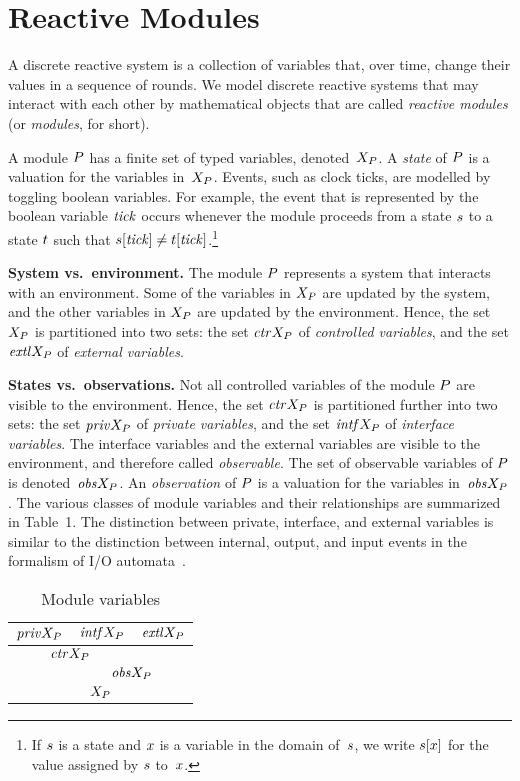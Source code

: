 \section{Reactive Modules}

A discrete reactive system is a collection of variables that, over time,
change their values in a sequence of rounds.
We model discrete reactive systems that may interact with each other by
mathematical objects that are called {\em reactive modules\/}
(or {\em modules}, for short).

 A module ${P}$ has a finite
set of typed variables, denoted~$X_{{P}}$. A {\em state\/} of
${P}$ is a valuation for the variables in~$X_{{P}}$. Events,
such as clock ticks, are modelled by toggling boolean variables.
For example, the event that is represented by the boolean variable
${\it tick\/}$ occurs whenever the module proceeds from a state $s$
to a state $t$ such that
$s[{\it tick\/}]\not=t[{\it tick\/}]$.\footnote{
  If $s$ is a state and $x$ is a variable in the domain of~$s$,
  we write $s[x]$ for the value assigned by $s$ to~$x$.}

\mypar
{\bf System vs.\ environment.}
The module ${P}$ represents a system that interacts with an environment.
Some of the variables in $X_{{P}}$ are updated by the system, and the
other variables in $X_{{P}}$ are updated by the environment.
Hence, the set $X_{{P}}$ is partitioned into two sets:
the set ${\it ctr}X_{{P}}$ of {\em controlled variables}, and the set
${\it extl}X_{{P}}$ of {\em external variables}.

\mypar
{\bf States vs.\ observations.}
Not all controlled variables of the module ${P}$ are visible to the
environment.
Hence, the set ${\it ctr}X_{{P}}$ is partitioned further into two sets:
the set ${\it priv}X_{{P}}$ of {\em private variables}, and the set ${\it intf}X_{{P}}$ of
{\em interface variables}.
The interface variables and the external variables are visible to the
environment, and therefore called {\em observable}.
The set of observable variables of ${P}$ is denoted~${\it obs}X_{{P}}$.
An {\em observation\/} of ${P}$ is a valuation for the variables
in~${\it obs}X_{{P}}$.
The various classes of module variables and their relationships are
summarized in Table~1.
The distinction between private, interface, and external variables is similar
to the distinction between internal, output, and input events in the
formalism of I/O automata~\cite{Lynch96}.

\begin{table}
\begin{center}
\begin{tabular}{|c|c|c|}
  \hline
  ${\it priv}X_{{P}}$ &${\it intf}X_{{P}}$&${\it extl}X_{{P}}$\\
  \hline
  \multicolumn{2}{|c|}{${\it ctr}X_{{P}}$} & \\
  \hline
  &\multicolumn{2}{c|}{${\it obs}X_{{P}}$}\\
  \hline
  \multicolumn{3}{|c|}{$X_{{P}}$}\\
  \hline
\end{tabular}
\end{center}
\caption{Module variables}
\end{table}


